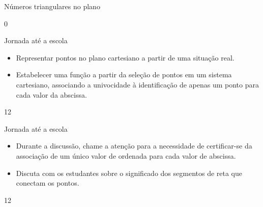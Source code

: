 \begin{answer}{Números triangulares no plano}
{
}{0}
\end{answer}
\clearmargin
\begin{objectives}{Jornada até a escola}
{
\begin{itemize}

\item  Representar pontos no plano cartesiano a partir de uma situação real.

\item  Estabelecer uma função a partir da seleção de pontos em um sistema cartesiano, associando a univocidade à identificação de apenas um ponto para cada valor da abscissa.

\end{itemize}
}{1}{2}
\end{objectives}
\begin{sugestions}{Jornada até a escola}
{
\begin{itemize}
\item Durante a discussão, chame a atenção para a necessidade de certificar-se da associação de um único valor de ordenada para cada valor de abscissa.

\item Discuta com os estudantes sobre o significado dos segmentos de reta que conectam os pontos.
\end{itemize}
}{1}{2}
\end{sugestions}
